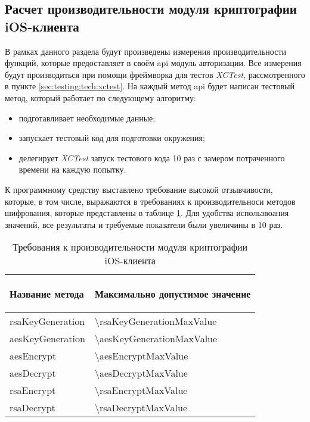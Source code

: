\subsection{Расчет производительности модуля криптографии iOS-клиента}
\label{sec:eng:performance}

В рамках данного раздела будут произведены измерения производительности функций, которые предоставляет в своём \gls{api} модуль авторизации. Все измерения будут производиться при помощи фреймворка для тестов \textit{XCTest}, рассмотренного в пункте \ref{sec:testing:tech:xctest}. На каждый метод \gls{api} будет написан тестовый метод, который работает по следующему алгоритму:

\begin{itemize}
	\item подготавливает необходимые данные;
	\item запускает тестовый код для подготовки окружения;
	\item делегирует \textit{XCTest} запуск тестового кода 10 раз с замером потраченного времени на каждую попытку.
\end{itemize}

К программному средству выставлено требование высокой отзывчивости, которые, в том числе, выражаются в требованиях к производительноси методов шифрования, которые представлены в таблице \ref{sec:eng:performance:aesenc:expected}. Для удобства использвоания значений, все результаты и требуемые показатели были увеличины в 10 раз.


\newcommand{\perfDev}{\text{П}_\text{о}}
\newcommand{\perfLimit}{\text{П}_\text{пд}}
\newcommand{\perfMax}{\text{П}_\text{макс}}
\newcommand{\perfMin}{\text{П}_\text{мин}}
\newcommand{\perfAverage}{\text{П}_\text{ср}}

\begin{table}[!ht]
  \caption{Требования к производительности модуля криптографии iOS-клиента}
  \label{sec:eng:performance:aesenc:expected}
  \centering
  \begin{tabularx}{\linewidth}{
    |>{\hsize=1.4\hsize}X|
    >{\centering\arraybackslash\hsize=0.6\hsize}X|
  }
  \hline
 \begin{center}Название метода\end{center} & Максимально допустимое значение \\
 \hline
 rsaKeyGeneration & \num{\rsaKeyGenerationMaxValue} \\
 \hline
 aesKeyGeneration & \num{\aesKeyGenerationMaxValue} \\
 \hline
 aesEncrypt & \num{\aesEncryptMaxValue} \\
 \hline
 aesDecrypt & \num{\aesDecryptMaxValue} \\
 \hline
 rsaEncrypt & \num{\rsaEncryptMaxValue} \\
 \hline
 rsaDecrypt & \num{\rsaDecryptMaxValue} \\
 \hline
  \end{tabularx}
\end{table}

